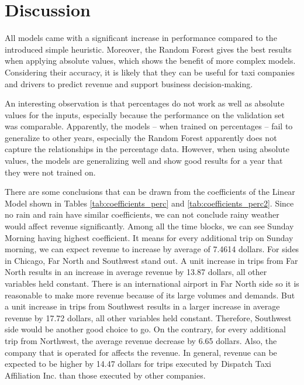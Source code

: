 \documentclass[twoside,11pt]{article}
\begin{document}
\section{Discussion} 

All models came with a significant increase in performance compared to the introduced simple heuristic. Moreover, the Random Forest gives the best results when applying absolute values, which shows the benefit of more complex models. Considering their accuracy, it is likely that they can be useful for taxi companies and drivers to predict revenue and support business decision-making.\par

An interesting observation is that percentages do not work as well as absolute values for the inputs, especially because the performance on the validation set was comparable. Apparently, the models -- when trained on percentages -- fail to generalize to other years, especially the Random Forest apparently does not capture the relationships in the percentage data. However, when using absolute values, the models are generalizing well and show good results for a year that they were not trained on.\par

There are some conclusions that can be drawn from the coefficients of the Linear Model shown in Tables  \ref{tab:coefficients_perc} and \ref{tab:coefficients_perc2}. Since no rain and rain have similar coefficients, we can not conclude rainy weather would affect revenue significantly. Among all the time blocks, we can see Sunday Morning having highest coefficient. It means for every additional trip on Sunday morning, we can expect revenue to increase by average of 7.4614 dollars. For sides in Chicago, Far North and Southwest stand out. A unit increase in trips from Far North results in an increase in average revenue by 13.87 dollars, all other variables held constant. There is an international airport in Far North side so it is reasonable to make more revenue because of its large volumes and demands. But a unit increase in trips from Southwest results in a larger increase in average revenue by 17.72 dollars, all other variables held constant. Therefore, Southwest side would be another good choice to go. On the contrary, for every additional trip from Northwest, the average revenue decrease by 6.65 dollars. Also, the company that is operated for affects the revenue. In general, revenue can be expected to be higher by 14.47 dollars for trips executed by Dispatch Taxi Affiliation Inc. than those executed by other companies. 
\end{document}
